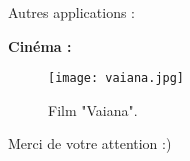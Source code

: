 \documentclass[11pt]{beamer}
\begin{document}

\begin{frame}{Autres applications :}

\textbf{Cinéma :}
\begin{center}
\begin{figure}
\texttt{[image: vaiana.jpg]}
\caption{Film "Vaiana".}
\end{figure}
\end{center}

\end{frame}


\begin{frame}
\begin{center}
Merci de votre attention :)
\end{center}
\end{frame}
\end{document}
